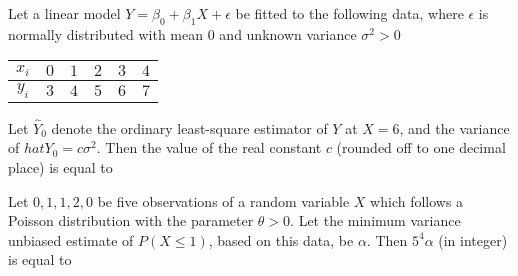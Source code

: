     \item Let a linear model $Y=\beta_0+\beta_1X+\epsilon$ be fitted to the following data, where $\epsilon$ is normally distributed with mean $0$ and unknown variance $\sigma^2>0$
        \begin{table}[!ht]
            \centering
            \begin{tabular}{|c|c|c|c|c|c|}
\hline
$x_{i}$ & $0$ & $1$ & $2$ & $3$ & $4$ \\
\hline
$y_{i}$ & $3$ & $4$ & $5$ & $6$ & $7$ \\
\hline
\end{tabular}
        \end{table}
        Let $\hat{Y}_{0}$ denote the ordinary least-square estimator of $Y$ at $X = 6$, and the variance of $hat{Y}_0=c\sigma^2$. Then the value of the real constant $c$ (rounded off to one decimal place) is equal to \underline{\hspace{1cm}}

    \item Let $0, 1, 1, 2, 0$ be five observations of a random variable $X$ which follows a Poisson distribution with the parameter $\theta > 0$. Let the minimum variance unbiased estimate of $P(X \leq 1)$, based on this data, be $\alpha$. Then $5^4\alpha$ (in integer) is equal to \underline{\hspace{1cm}}

